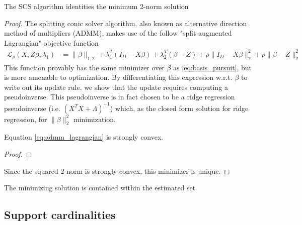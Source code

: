 \begin{proposition}
The SCS algorithm identities the minimum 2-norm solution
\end{proposition}
\begin{proof}
The splitting conic solver algorithm, also known as alternative direction method of multipliers (ADMM), makes use of the follow "split augmented Lagrangian" objective function
\begin{align}
\label{eq:admm_lagrangian}
\mathcal L_\rho (X, Z \beta, \lambda_1) &= \|\beta\|_{1,2} + \lambda_1^T (I_D - X \beta) + \lambda_2^T (\beta - Z)  +  \rho \| I_D - X \beta\|_2^2 + \rho \|\beta - Z\|_2^2
\end{align}
This function provably has the same minimizer over $\beta$ as \ref{eq:basis_pursuit}, but is more amenable to optimization.
By differentiating this expression w.r.t. $\beta$ to write out its update rule, we show that the update requires computing a pseudoinverse.
This pseudoinverse is in fact chosen to be a ridge regression pseudoinverse (i.e. $(X^T X + \Lambda)^{-1} $) which, as the closed form solution for ridge regression, for $\|\beta\|_2^2$ minimization.



\begin{proposition}
Equation \ref{eq:admm_lagrangian} is strongly convex.
\end{proposition}
\begin{proof}
\end{proof}

Since the squared $2$-norm is strongly convex, this minimizer is unique.
\end{proof}

\begin{proposition}
The minimizing solution is contained within the estimated set
\end{proposition}


\newpage

\subsection{Support cardinalities}
\label{sec:support_cardinalities}

